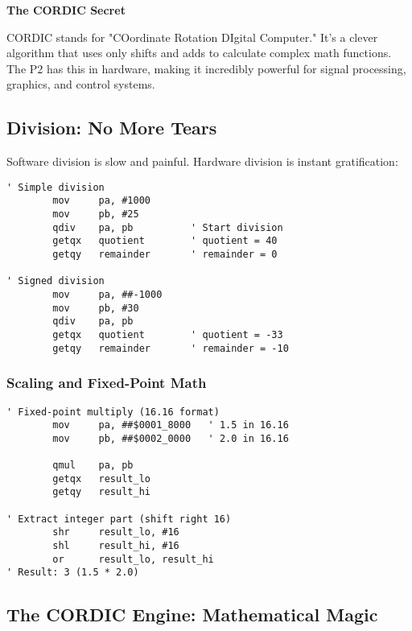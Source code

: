 \documentclass[11pt]{book}
\begin{document}
\begin{sidetrack}
\textbf{The CORDIC Secret}

CORDIC stands for "COordinate Rotation DIgital Computer." It's a clever algorithm that uses only shifts and adds to calculate complex math functions. The P2 has this in hardware, making it incredibly powerful for signal processing, graphics, and control systems.
\end{sidetrack}

\hypertarget{division-no-more-tears}{%
\subsection{Division: No More Tears}\label{division-no-more-tears}}

Software division is slow and painful. Hardware division is instant
gratification:

\begin{lstlisting}
' Simple division
        mov     pa, #1000
        mov     pb, #25
        qdiv    pa, pb          ' Start division
        getqx   quotient        ' quotient = 40
        getqy   remainder       ' remainder = 0
        
' Signed division
        mov     pa, ##-1000
        mov     pb, #30
        qdiv    pa, pb
        getqx   quotient        ' quotient = -33
        getqy   remainder       ' remainder = -10
\end{lstlisting}

\hypertarget{scaling-and-fixed-point-math}{%
\subsubsection{Scaling and Fixed-Point
Math}\label{scaling-and-fixed-point-math}}

\begin{lstlisting}
' Fixed-point multiply (16.16 format)
        mov     pa, ##$0001_8000   ' 1.5 in 16.16
        mov     pb, ##$0002_0000   ' 2.0 in 16.16
        
        qmul    pa, pb
        getqx   result_lo
        getqy   result_hi
        
' Extract integer part (shift right 16)
        shr     result_lo, #16
        shl     result_hi, #16
        or      result_lo, result_hi
' Result: 3 (1.5 * 2.0)
\end{lstlisting}

\hypertarget{the-cordic-engine-mathematical-magic}{%
\subsection{The CORDIC Engine: Mathematical
Magic}\label{the-cordic-engine-mathematical-magic}}
\end{document}
